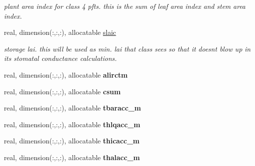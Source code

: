 \begin{DoxyCompactItemize}
\begin{DoxyCompactList}\small\item\em plant area index for class\textquotesingle{} 4 pfts. this is the sum of leaf area index and stem area index. \end{DoxyCompactList}\item 
\hypertarget{structctem__statevars_1_1veg__rot_ac2d4ed49f4b5db0802dba3d59b16643b}{}real, dimension(\+:,\+:,\+:), allocatable \hyperlink{structctem__statevars_1_1veg__rot_ac2d4ed49f4b5db0802dba3d59b16643b}{slaic}\label{structctem__statevars_1_1veg__rot_ac2d4ed49f4b5db0802dba3d59b16643b}

\begin{DoxyCompactList}\small\item\em storage lai. this will be used as min. lai that class sees so that it doesn\textquotesingle{}t blow up in its stomatal conductance calculations. \end{DoxyCompactList}\item 
\hypertarget{structctem__statevars_1_1veg__rot_af5333dbb8674de16a7957022f7f8a1f0}{}real, dimension(\+:,\+:,\+:), allocatable {\bfseries alirctm}\label{structctem__statevars_1_1veg__rot_af5333dbb8674de16a7957022f7f8a1f0}

\item 
\hypertarget{structctem__statevars_1_1veg__rot_a5cf27d52f2cbc629391ed541832a81c5}{}real, dimension(\+:,\+:,\+:), allocatable {\bfseries csum}\label{structctem__statevars_1_1veg__rot_a5cf27d52f2cbc629391ed541832a81c5}

\item 
\hypertarget{structctem__statevars_1_1veg__rot_a3f0500d5c8f6e46adb04491a4172a6e4}{}real, dimension(\+:,\+:,\+:), allocatable {\bfseries tbaracc\+\_\+m}\label{structctem__statevars_1_1veg__rot_a3f0500d5c8f6e46adb04491a4172a6e4}

\item 
\hypertarget{structctem__statevars_1_1veg__rot_a71ac0a120f62648d0d7fe58a586e0193}{}real, dimension(\+:,\+:,\+:), allocatable {\bfseries thlqacc\+\_\+m}\label{structctem__statevars_1_1veg__rot_a71ac0a120f62648d0d7fe58a586e0193}

\item 
\hypertarget{structctem__statevars_1_1veg__rot_a5e6e9a95996948e81fc181c1bba9109d}{}real, dimension(\+:,\+:,\+:), allocatable {\bfseries thicacc\+\_\+m}\label{structctem__statevars_1_1veg__rot_a5e6e9a95996948e81fc181c1bba9109d}

\item 
\hypertarget{structctem__statevars_1_1veg__rot_ac9ab8436d1979eb08ba100c6fbae73b1}{}real, dimension(\+:,\+:,\+:), allocatable {\bfseries thalacc\+\_\+m}\label{structctem__statevars_1_1veg__rot_ac9ab8436d1979eb08ba100c6fbae73b1}


\end{DoxyCompactItemize}
